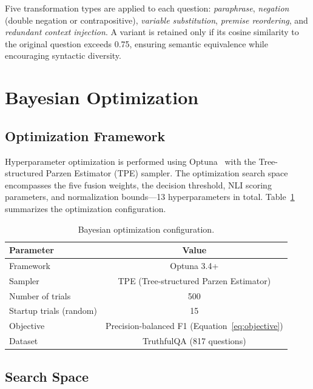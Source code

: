 Five transformation types are applied to each question: \emph{paraphrase}, \emph{negation} (double negation or contrapositive), \emph{variable substitution}, \emph{premise reordering}, and \emph{redundant context injection}. A variant is retained only if its cosine similarity to the original question exceeds 0.75, ensuring semantic equivalence while encouraging syntactic diversity.

\section{Bayesian Optimization}
\label{sec:bayesian-opt}

\subsection{Optimization Framework}

Hyperparameter optimization is performed using Optuna~\cite{akiba2019optuna} with the Tree-structured Parzen Estimator (TPE) sampler. The optimization search space encompasses the five fusion weights, the decision threshold, NLI scoring parameters, and normalization bounds---13 hyperparameters in total. Table~\ref{tab:opt-config} summarizes the optimization configuration.

\begin{table}[!htbp]
    \centering
    \caption{Bayesian optimization configuration.}
    \label{tab:opt-config}
    \begin{tabular}{lc}
        \toprule
        \textbf{Parameter} & \textbf{Value} \\
        \midrule
        Framework                   & Optuna 3.4+ \\
        Sampler                     & TPE (Tree-structured Parzen Estimator) \\
        Number of trials            & 500 \\
        Startup trials (random)     & 15 \\
        Objective                   & Precision-balanced F1 (Equation~\ref{eq:objective}) \\
        Dataset                     & TruthfulQA (817 questions) \\
        \bottomrule
    \end{tabular}
\end{table}

\subsection{Search Space}

